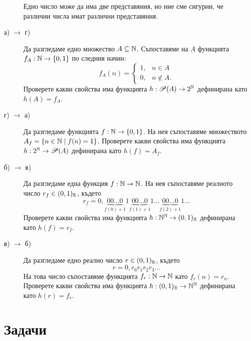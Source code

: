 \begin{hint}
\begin{description}
    Едно число може да има две представяния, но ние сме сигурни, че различни числа имат различни представяния.
  \item[а) $\rightarrow$ г)]
    Да разгледаме едно множество $A \subseteq \mathbb{N}$.
    Съпоставяме на $A$ функцията $f_A:\mathbb{N} \to \{0,1\}$  по следния начин:
    \[
    f_A(n) = 
    \begin{cases}
      1, & n \in A\\
      0, & n\not\in A.
    \end{cases}
    \]
    Проверете какви свойства има функцията $h:\mathscr{P}(A) \to 2^{\mathbb{N}}$ дефинирана като $h(A) = f_A$.
  \item[г) $\rightarrow$ а)]
    Да разгледаме функцията $f:\mathbb{N}\to\{0,1\}$.
    На нея съпоставяме множеството $A_f = \{n \in \mathbb{N} \mid f(n) = 1\}$.
    Проверете какви свойства има функцията $h:2^{\mathbb{N}} \to \mathscr{P}(A)$ дефинирана като $h(f) = A_f$.
  \item[б) $\rightarrow$ в)]
    Да разгледаме една функция $f:\mathbb{N}\to\mathbb{N}$.
    На нея съпоставяме реалното число $r_f \in (0,1)_{\mathbb{R}}$, където
    \[r_f = 0,\underbrace{00\dots 0}_{f(0)+1}1\underbrace{00\dots 0}_{f(1)+1}1\dots\underbrace{00\dots 0}_{f(2)+1}1\dots\]
    Проверете какви свойства има функцията $h:\mathbb{N}^{\mathbb{N}} \to (0,1)_{\mathbb{R}}$ дефинирана като $h(f) = r_f$.
  \item[в) $\rightarrow$ б)]
    Да разгледаме едно реално число $r\in (0,1)_{\mathbb{R}}$, където
    \[r = 0, r_0r_1r_2r_3\dots\]
    На това число съпоставяме функцията $f_r:\mathbb{N}\to\mathbb{N}$ като $f_r(n) = r_n$.
    Проверете какви свойства има функцията $h:(0,1)_{\mathbb{R}} \to \mathbb{N}^{\mathbb{N}}$ дефинирана като $h(r) = f_r$.
  \end{description}
\end{hint}

\section{Задачи}

